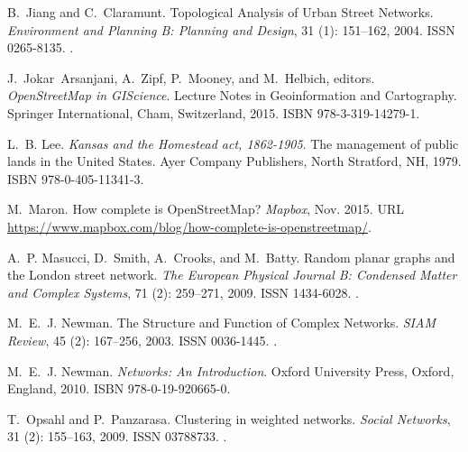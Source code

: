 \documentclass[Afour,sageh,times]{sagej}
\begin{document}
\begin{thebibliography}{54}
	B.~Jiang and C.~Claramunt.
	\newblock Topological {Analysis} of {Urban} {Street} {Networks}.
	\newblock \emph{Environment and Planning B: Planning and Design}, 31
	(1): 151--162, 2004.
	\newblock ISSN 0265-8135.
	\newblock {}.
	
	J.~Jokar~Arsanjani, A.~Zipf, P.~Mooney, and M.~Helbich, editors.
	\newblock \emph{{OpenStreetMap} in {GIScience}}.
	\newblock Lecture {Notes} in {Geoinformation} and {Cartography}. Springer
	International, Cham, Switzerland, 2015.
	\newblock ISBN 978-3-319-14279-1.
	
	L.~B. Lee.
	\newblock \emph{Kansas and the {Homestead} act, 1862-1905}.
	\newblock The management of public lands in the {United} {States}. Ayer Company
	Publishers, North Stratford, NH, 1979.
	\newblock ISBN 978-0-405-11341-3.
	
	M.~Maron.
	\newblock How complete is {OpenStreetMap}?
	\newblock \emph{Mapbox}, Nov. 2015.
	\newblock URL \url{https://www.mapbox.com/blog/how-complete-is-openstreetmap/}.
	
	A.~P. Masucci, D.~Smith, A.~Crooks, and M.~Batty.
	\newblock Random planar graphs and the {London} street network.
	\newblock \emph{The European Physical Journal B: Condensed Matter and Complex
		Systems}, 71 (2): 259--271, 2009.
	\newblock ISSN 1434-6028.
	\newblock {}.
	
	M.~E.~J. Newman.
	\newblock The {Structure} and {Function} of {Complex} {Networks}.
	\newblock \emph{SIAM Review}, 45 (2): 167--256, 2003.
	\newblock ISSN 0036-1445.
	\newblock {}.
	
	M.~E.~J. Newman.
	\newblock \emph{Networks: {An} {Introduction}}.
	\newblock Oxford University Press, Oxford, England, 2010.
	\newblock ISBN 978-0-19-920665-0.
	
	T.~Opsahl and P.~Panzarasa.
	\newblock Clustering in weighted networks.
	\newblock \emph{Social Networks}, 31 (2): 155--163, 2009.
	\newblock ISSN 03788733.
	\newblock {}.
	

\end{thebibliography}
\end{document}
